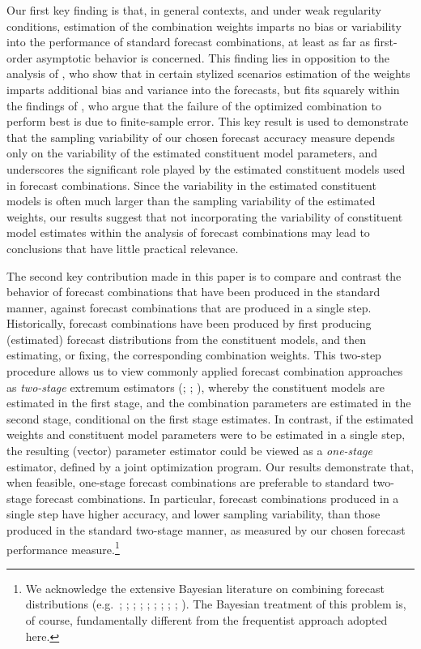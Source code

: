 \documentclass[12pt]{article}
\theoremstyle{definition}
\theoremstyle{remark}
\begin{document}
{Our first key finding is that, in general contexts, and under weak regularity conditions, estimation of the combination weights imparts no bias or variability into the performance of standard forecast combinations, at least as far as first-order asymptotic behavior is concerned. This finding lies in opposition to the analysis of \cite{Claeskens2016}, who show that in certain stylized scenarios estimation of the weights imparts additional bias and variance into the forecasts, but fits squarely within the findings of \cite{Smith2009}, who argue that the {failure of the optimized combination to perform best} is due to finite-sample error. This key result is used to demonstrate that the sampling variability of our chosen forecast accuracy measure depends only on the variability of the estimated constituent model parameters, and underscores the significant role played by the estimated constituent models used in forecast combinations. Since the variability in the estimated constituent models is often much larger than the sampling variability of the estimated weights, our results suggest that not incorporating the variability of constituent model estimates within the analysis of forecast combinations may lead to conclusions that have little practical relevance.

The second key contribution made in this paper is to compare and contrast the behavior of forecast combinations that have been produced in the standard manner, against forecast combinations that are produced in a single step. Historically, forecast combinations have been produced by first producing (estimated) forecast distributions from the constituent models, and then estimating, or fixing, the corresponding combination weights. This two-step procedure allows us to view commonly applied forecast combination approaches as \textit{two-stage} extremum estimators (\citealp{Pagan1986}; \citealp{Newey1994}; \citealp{Frazier2017}), whereby the constituent models are estimated in the first stage, and the combination parameters are estimated in the second stage, conditional on the first stage estimates. In contrast, if the estimated weights and constituent model parameters were to be estimated in a single step, the resulting (vector) parameter estimator could be viewed as a \textit{one-stage} estimator, defined by a joint optimization program. Our results demonstrate that, when feasible, one-stage forecast combinations are preferable to standard two-stage forecast combinations. In particular, forecast combinations produced in a single step have higher accuracy, and lower sampling variability, than those produced in the standard two-stage manner, as measured by our chosen forecast performance measure.\footnote{\scriptsize We acknowledge the extensive Bayesian literature on combining forecast distributions (e.g.\ \citealp{Billio2013}; \citealp{Casarin2015}; \citealp{Casarin2016}; \citealp{Pettenuzzo2016}; \citealp{Aastveit2018}; \citealp{Bassetti2018}; \citealp{Bastuerk2019}; \citealp{Casarin2019}; \citealp{McAlinn2019}; \citealp{Loaiza-Maya2021}). The Bayesian treatment of this problem is, of course, fundamentally different from the frequentist approach adopted here.}

}
\end{document}
